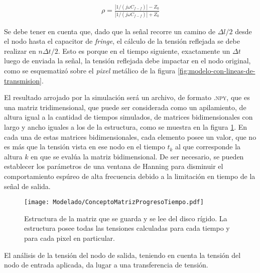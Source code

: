 \begin{align}
	\rho =   \frac{|1/(j\omega C_{f-f})| - Z_0}{|1/(j\omega C_{f-f})| + Z_0}
\end{align}

Se debe tener en cuenta que, dado que la señal recorre un camino de $\Delta l / 2$ desde el nodo hasta el capacitor de \textit{fringe}, el cálculo de la tensión reflejada se debe realizar en $n\Delta t/2$. Esto es porque en el tiempo siguiente, exactamente un $\Delta t$ luego de enviada la señal, la tensión reflejada debe impactar en el nodo original, como se esquematizó sobre el \textit{pixel} metálico de la figura \ref{fig:modelo-con-lineas-de-transmision}.

El resultado arrojado por la simulación será un archivo, de formato \textsc{.npy}, que es una matriz tridimensional, que puede ser considerada como un apilamiento, de altura igual a la cantidad de tiempos simulados, de matrices bidimensionales con largo y ancho iguales a los de la estructura, como se muestra en la figura \ref{fig:EstructuraTiemposMatrizNumpy}. En cada una de estas matrices bidimensionales, cada elemento posee un valor, que no es más que la tensión vista en ese nodo en el tiempo $t_k$ al que corresponde la altura $k$ en que se evalúa la matriz bidimensional. De ser necesario, se pueden establecer los parámetros de una ventana de Hanning para disminuir el comportamiento espúreo de alta frecuencia debido a la limitación en tiempo de la señal de salida.

\begin{figure}[h]
	\centering
	\texttt{[image: Modelado/ConceptoMatrizProgresoTiempo.pdf]}
	\caption{Estructura de la matriz que se guarda y se lee del disco rígido. La estructura posee todas las tensiones calculadas para cada tiempo y para cada pixel en particular.}
	\label{fig:EstructuraTiemposMatrizNumpy}
\end{figure}

El análisis de la tensión del nodo de salida, teniendo en cuenta la tensión del nodo de entrada aplicada, da lugar a una transferencia de tensión.